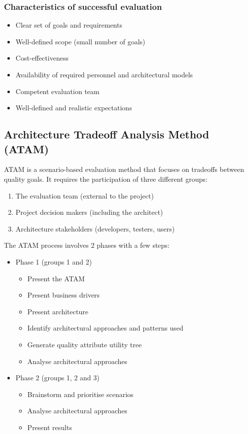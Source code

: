 \documentclass{sty/SizheArticle}
\begin{document}
\subsubsection{Characteristics of successful evaluation}
\begin{itemize}
\item Clear set of goals and requirements
\item Well-defined scope (small number of goals)
\item Cost-effectiveness
\item Availability of required personnel and architectural models
\item Competent evaluation team
\item Well-defined and realistic expectations
\end{itemize}

\subsection{Architecture Tradeoff Analysis Method (ATAM)}
ATAM is a scenario-based evaluation method that focuses on tradeoffs
between quality goals. It requires the participation of three
different groups:
\begin{enumerate}
\item The evaluation team (external to the project)
\item Project decision makers (including the architect)
\item Architecture stakeholders (developers, testers, users)
\end{enumerate}

The ATAM process involves 2 phases with a few steps:
\begin{itemize}
\item Phase 1 (groups 1 and 2)
  \begin{itemize}
  \item Present the ATAM
  \item Present business drivers
  \item Present architecture
  \item Identify architectural approaches and patterns used
  \item Generate quality attribute utility tree
  \item Analyse architectural approaches
  \end{itemize}
\item Phase 2 (groups 1, 2 and 3)
  \begin{itemize}
  \item Brainstorm and prioritise scenarios
  \item Analyse architectural approaches
  \item Present results
  \end{itemize}
\end{itemize}
\end{document}
